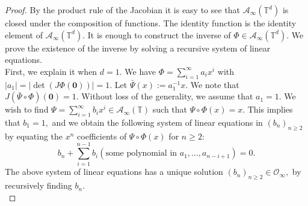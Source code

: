 \documentclass[10pt]{amsart}
\theoremstyle{plain}
\theoremstyle{plain}
\renewcommand{\vec}[1]{\mathbf{#1}}
\theoremstyle{remark}
\theoremstyle{definition}
\newcommand{\TT}{\mathbb{T}}
\newcommand{\cA}{\mathcal{A}}
\newcommand{\cO}{\mathcal{O}}
\begin{document}
\begin{proof}
By the product rule of the Jacobian it is easy to see that $\cA_{\infty}(\TT^d)$ is closed under the composition of functions.  The identity function is the identity element of $\cA_{\infty}(\TT^d).$ It is enough to construct the inverse of $\Phi \in \cA_{\infty}(\TT^d).$ We prove the existence of the inverse by solving a  recursive system of linear equations.
\\

 First,  we explain it when  $d=1.$ We have $\Phi=\sum_{i=1}^{\infty} a_ix^i$ with $|a_1|=|\det(J\Phi(\vec{0}))|=1$.  Let $\bar{\Psi}(x):=a_1^{-1}x.$    We note that 
$J(\bar{\Psi} \circ \Phi)(\vec{0})= 1.$ Without loss of the generality, we assume that $a_1= 1.$ We wish to find $\Psi=\sum_{i=1}^{\infty} b_ix^i \in \cA_{\infty}(\TT)$ such that $ \Psi \circ \Phi(x) =x. $ This implies that $b_1=1,$ and we obtain the following system of linear equations in $(b_n)_{n\geq 2}$ by equating the $x^n$ coefficients of $\Psi \circ \Phi(x) $ for $n\geq 2:$
\[
b_n  +\sum_{i=1}^{n-1} b_i (\text{some polynomial in $a_1,\dots ,a_{n-i+1}$})=0.
\]
The above system of linear equations has a unique solution  $(b_n)_{n\geq 2} \in \cO_{\infty},$ by recursively finding  $b_n.$  
\\


\end{proof}
\end{document}
